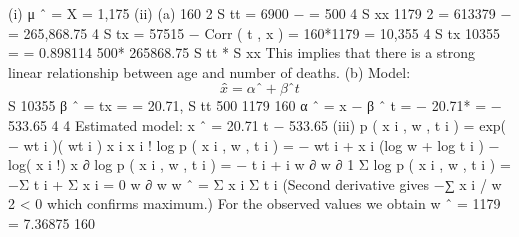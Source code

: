 \documentclass[a4paper,12pt]{article}
\begin{document}
(i) μ ˆ = X = 1,175
(ii)
(a)
160 2
S tt = 6900 −
= 500
4
S xx
1179 2
= 613379 −
= 265,868.75
4
S tx = 57515 −
Corr ( t , x ) =
160*1179
= 10,355
4
S tx
10355
=
= 0.898114
500* 265868.75
S tt * S xx
This implies that there is a strong linear relationship between age and number of deaths.
(b)
Model: \[x̂ = α ˆ + β ˆ t\]
S
10355
β ˆ = tx =
= 20.71,
S tt
500
1179
160
α ˆ = x − β ˆ t =
− 20.71*
= − 533.65
4
4
Estimated model: x ˆ = 20.71 t − 533.65
(iii)
p ( x i , w , t i ) =
exp( − wt i )( wt i ) x i
x i !
log p ( x i , w , t i ) = − wt i + x i (log w + log t i ) − log( x i !)
x
∂
log p ( x i , w , t i ) = − t i + i
w
∂ w
∂
1
Σ
log p ( x i , w , t i ) = −Σ t i + Σ x i = 0
w
∂ w
w ˆ =
Σ x i
Σ t i
(Second derivative gives −∑ x i / w 2 < 0 which confirms maximum.)
For the observed values we obtain w ˆ =
1179
= 7.36875
160
\end{document}
